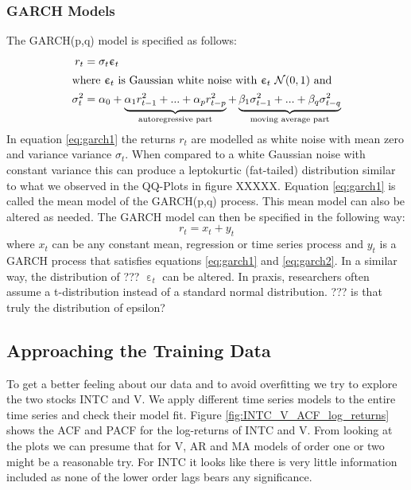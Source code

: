 \subsubsection{GARCH Models}
The GARCH(p,q) model is specified as follows:
\begin{align}
    r_{t} &= \sigma_t  \upepsilon_t \label{eq:garch1}\\
\intertext{where $\upepsilon_t$ is Gaussian white noise with  $\upepsilon_t ~ \mathcal{N}(0,1)$ and}
    \sigma^2_t &= \alpha_0 + \underbrace{\alpha_1 r^2_{t-1} + ... + \alpha_p r^2_{t-p}}_\text{autoregressive part} + \underbrace{\beta_1 \sigma^2_{t-1} + ... + \beta_q \sigma^2_{t-q}}_\text{moving average part} \label{eq:garch2}
\end{align}{}
In equation \ref{eq:garch1} the returns $r_t$ are modelled as white noise with mean zero and variance variance $\sigma_t$. When compared to a white Gaussian noise with constant variance this can produce a leptokurtic (fat-tailed) distribution similar to what we observed in the QQ-Plots in figure XXXXX. Equation \ref{eq:garch1} is called the mean model of the GARCH(p,q) process. This mean model can also be altered as needed. The GARCH model can then be specified in the following way: 
\begin{equation}
    r_t = x_t + y_t
\end{equation}{}
where $x_t$ can be any constant mean, regression or time series process and $y_t$ is a GARCH process that satisfies equations \ref{eq:garch1} and \ref{eq:garch2}. In a similar way, the distribution of ??? $\upepsilon_t$ can be altered. In praxis, researchers often assume a t-distribution instead of a standard normal distribution. ??? is that truly the distribution of epsilon?



\subsection{Approaching the Training Data}
To get a better feeling about our data and to avoid overfitting we try to explore the two stocks INTC and V. We apply different time series models to the entire time series and check their model fit. Figure \ref{fig:INTC_V_ACF_log_returns} shows the ACF and PACF for the log-returns of INTC and V. From looking at the plots we can presume that for V, AR and MA models of order one or two might be a reasonable try. For INTC it looks like there is very little information included as none of the lower order lags bears any significance. 

